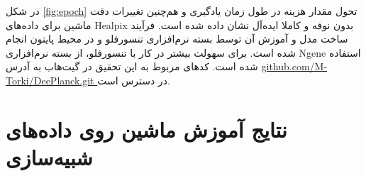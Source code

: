   در شکل 
\ref{fig:epoch} 
تحول مقدار هزینه در طول زمان یادگیری و هم‌چنین تغییرات دقت ماشین برای داده‌های Healpix بدون نوفه و کاملا ایده‌آل نشان داده ‌شده است. فرآیند ساخت مدل و آموزش آن توسط بسته نرم‌افزاری تنسورفلو
\cite{abadi2016tensorflow}
و در محیط پایتون انجام شده است. برای سهولت بیشتر در کار با تنسورفلو، از بسته نرم‌افزاری 
Ngene 
استفاده شده است. کدهای مربوط به این تحقیق در گیت‌هاب
 به آدرس
\url{github.com/M-Torki/DeePlanck.git }
در دسترس است.
  
  
  
  \section{نتایج آموزش ماشین روی داده‌های شبیه‌سازی }
  \label{sec:results}
  
